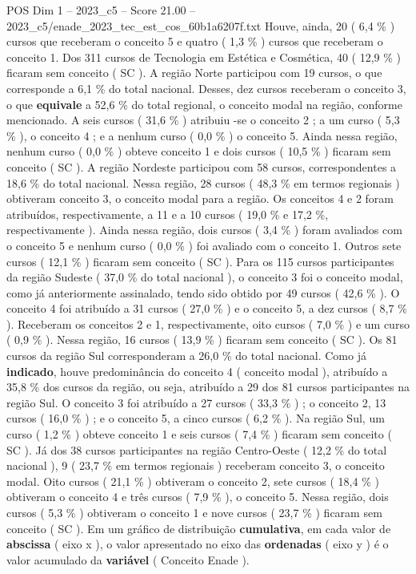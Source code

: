 \begin{textsample}{POS Dim 1 – 2023\_c5 – Score 21.00 – 2023\_c5/enade\_2023\_tec\_est\_cos\_60b1a6207f.txt}
Houve, ainda, 20 ( 6,4 \% ) cursos que receberam o conceito 5 e quatro ( 1,3 \% ) cursos que receberam o conceito 1.
Dos 311 cursos de Tecnologia em Estética e Cosmética, 40 ( 12,9 \% ) ficaram sem conceito ( SC ).
A região Norte participou com 19 cursos, o que corresponde a 6,1 \% do total nacional.
Desses, dez cursos receberam o conceito 3, o que \textbf{equivale} a 52,6 \% do total regional, o conceito modal na região, conforme mencionado.
A seis cursos ( 31,6 \% ) atribuiu -se o conceito 2 ; a um curso ( 5,3 \% ), o conceito 4 ; e a nenhum curso ( 0,0 \% ) o conceito 5.
Ainda nessa região, nenhum curso ( 0,0 \% ) obteve conceito 1 e dois cursos ( 10,5 \% ) ficaram sem conceito ( SC ).
A região Nordeste participou com 58 cursos, correspondentes a 18,6 \% do total nacional.
Nessa região, 28 cursos ( 48,3 \% em termos regionais ) obtiveram conceito 3, o conceito modal para a região.
Os conceitos 4 e 2 foram atribuídos, respectivamente, a 11 e a 10 cursos ( 19,0 \% e 17,2 \%, respectivamente ).
Ainda nessa região, dois cursos ( 3,4 \% ) foram avaliados com o conceito 5 e nenhum curso ( 0,0 \% ) foi avaliado com o conceito 1.
Outros sete cursos ( 12,1 \% ) ficaram sem conceito ( SC ).
Para os 115 cursos participantes da região Sudeste ( 37,0 \% do total nacional ), o conceito 3 foi o conceito modal, como já anteriormente assinalado, tendo sido obtido por 49 cursos ( 42,6 \% ).
O conceito 4 foi atribuído a 31 cursos ( 27,0 \% ) e o conceito 5, a dez cursos ( 8,7 \% ).
Receberam os conceitos 2 e 1, respectivamente, oito cursos ( 7,0 \% ) e um curso ( 0,9 \% ).
Nessa região, 16 cursos ( 13,9 \% ) ficaram sem conceito ( SC ).
Os 81 cursos da região Sul corresponderam a 26,0 \% do total nacional.
Como já \textbf{indicado}, houve predominância do conceito 4 ( conceito modal ), atribuído a 35,8 \% dos cursos da região, ou seja, atribuído a 29 dos 81 cursos participantes na região Sul.
O conceito 3 foi atribuído a 27 cursos ( 33,3 \% ) ; o conceito 2, 13 cursos ( 16,0 \% ) ; e o conceito 5, a cinco cursos ( 6,2 \% ).
Na região Sul, um curso ( 1,2 \% ) obteve conceito 1 e seis cursos ( 7,4 \% ) ficaram sem conceito ( SC ).
Já dos 38 cursos participantes na região Centro-Oeste ( 12,2 \% do total nacional ), 9 ( 23,7 \% em termos regionais ) receberam conceito 3, o conceito modal.
Oito cursos ( 21,1 \% ) obtiveram o conceito 2, sete cursos ( 18,4 \% ) obtiveram o conceito 4 e três cursos ( 7,9 \% ), o conceito 5.
Nessa região, dois cursos ( 5,3 \% ) obtiveram o conceito 1 e nove cursos ( 23,7 \% ) ficaram sem conceito ( SC ).
Em um gráfico de distribuição \textbf{cumulativa}, em cada valor de \textbf{abscissa} ( eixo x ), o valor apresentado no eixo das \textbf{ordenadas} ( eixo y ) é o valor acumulado da \textbf{variável} ( Conceito Enade ).

\end{textsample}
